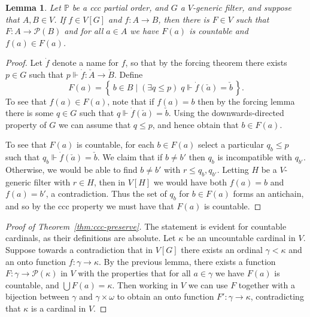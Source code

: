 \documentclass[11pt,oneside]{amsbook}
\newcommand{\set}[1]{\left\{\,#1\,\right\}}
\newcommand{\PP}{\mathbb P}
\newcommand{\forces}{\Vdash}
\theoremstyle{definition}
\theoremstyle{plain}
\newtheorem{lemma}[theorem]{Lemma}
\theoremstyle{definition}
\theoremstyle{remark}
\numberwithin{equation}{section}
\numberwithin{figure}{section}
\begin{document}
\begin{lemma}
  Let $\PP$ be a ccc partial order, and $G$ a $V$-generic filter, and suppose that $A,B\in V$. If $f\in V[G]$ and $f\colon A\to B$, then there is $F\in V$ such that $F\colon A\to\mathcal P(B)$ and for all $a\in A$ we have $F(a)$ is countable and $f(a)\in F(a)$.
\end{lemma}

\begin{proof}
  Let $\dot f$ denote a name for $f$, so that by the forcing theorem there exists $p\in G$ such that $p\forces \dot f\colon\check A\to\check B$. Define
  \[F(a)=\set{b\in B\mid(\exists q\leq p)\;q\forces\dot f(\check a)=\check b}\text{.}
  \]
  To see that $f(a)\in F(a)$, note that if $f(a)=b$ then by the forcing lemma there is some $q\in G$ such that $q\forces\dot f(\check a)=\check b$. Using the downwards-directed property of $G$ we can assume that $q\leq p$, and hence obtain that $b\in F(a)$.

  To see that $F(a)$ is countable, for each $b\in F(a)$ select a particular $q_b\leq p$ such that $q_b\forces\dot f(\check a)=\check b$. We claim that if $b\neq b'$ then $q_b$ is incompatible with $q_{b'}$. Otherwise, we would be able to find $b\neq b'$ with $r\leq q_b,q_{b'}$. Letting $H$ be a $V$-generic filter with $r\in H$, then in $V[H]$ we would have both $f(a)=b$ and $f(a)=b'$, a contradiction. Thus the set of $q_b$ for $b\in F(a)$ forms an antichain, and so by the ccc property we must have that $F(a)$ is countable.
\end{proof}

\begin{proof}[Proof of Theorem~\ref{thm:ccc-preserve}]
  The statement is evident for countable cardinals, as their definitions are absolute. Let $\kappa$ be an uncountable cardinal in $V$. Suppose towards a contradiction that in $V[G]$ there exists an ordinal $\gamma<\kappa$ and an onto function $f\colon\gamma\to\kappa$. By the previous lemma, there exists a function $F\colon\gamma\to\mathcal P(\kappa)$ in $V$ with the properties that for all $a\in\gamma$ we have $F(a)$ is countable, and $\bigcup F(a)=\kappa$. Then working in $V$ we can use $F$ together with a bijection between $\gamma$ and $\gamma\times\omega$ to obtain an onto function $F'\colon\gamma\to\kappa$, contradicting that $\kappa$ is a cardinal in $V$.
\end{proof}
\end{document}

